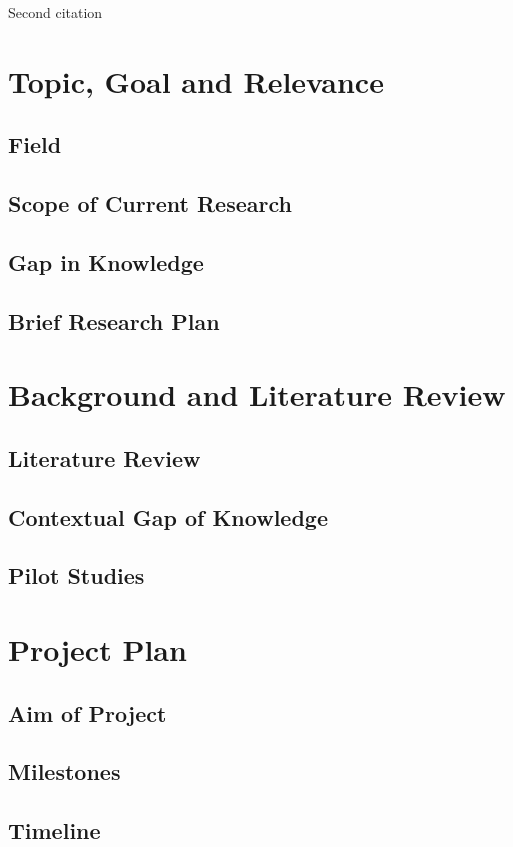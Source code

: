 \documentclass[12pt,a4paper]{article}
\begin{document}
Second citation \cite{SIGNAL2013}

\section{Topic, Goal and Relevance}
\subsection{Field}
\subsection{Scope of Current Research}
\subsection{Gap in Knowledge}
\subsection{Brief Research Plan}

\section{Background and Literature Review}
\subsection{Literature Review}
\subsection{Contextual Gap of Knowledge}
\subsection{Pilot Studies}


\section{Project Plan}
\subsection{Aim of Project}
\subsection{Milestones}
\subsection{Timeline}


\newpage


\end{document}
